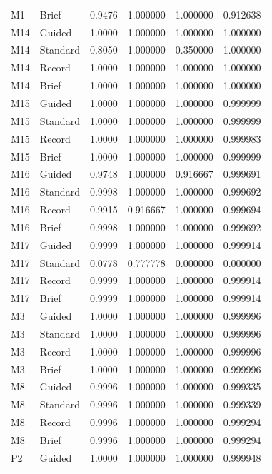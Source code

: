 \begin{longtable}{@{}llrrrr@{}}
M1 & Brief & 0.9476 & 1.000000 & 1.000000 & 0.912638 \\
\addlinespace[3pt]
M14 & Guided & 1.0000 & 1.000000 & 1.000000 & 1.000000 \\
M14 & Standard & 0.8050 & 1.000000 & 0.350000 & 1.000000 \\
M14 & Record & 1.0000 & 1.000000 & 1.000000 & 1.000000 \\
M14 & Brief & 1.0000 & 1.000000 & 1.000000 & 1.000000 \\
\addlinespace[3pt]
M15 & Guided & 1.0000 & 1.000000 & 1.000000 & 0.999999 \\
M15 & Standard & 1.0000 & 1.000000 & 1.000000 & 0.999999 \\
M15 & Record & 1.0000 & 1.000000 & 1.000000 & 0.999983 \\
M15 & Brief & 1.0000 & 1.000000 & 1.000000 & 0.999999 \\
\addlinespace[3pt]
M16 & Guided & 0.9748 & 1.000000 & 0.916667 & 0.999691 \\
M16 & Standard & 0.9998 & 1.000000 & 1.000000 & 0.999692 \\
M16 & Record & 0.9915 & 0.916667 & 1.000000 & 0.999694 \\
M16 & Brief & 0.9998 & 1.000000 & 1.000000 & 0.999692 \\
\addlinespace[3pt]
M17 & Guided & 0.9999 & 1.000000 & 1.000000 & 0.999914 \\
M17 & Standard & 0.0778 & 0.777778 & 0.000000 & 0.000000 \\
M17 & Record & 0.9999 & 1.000000 & 1.000000 & 0.999914 \\
M17 & Brief & 0.9999 & 1.000000 & 1.000000 & 0.999914 \\
\addlinespace[3pt]
M3 & Guided & 1.0000 & 1.000000 & 1.000000 & 0.999996 \\
M3 & Standard & 1.0000 & 1.000000 & 1.000000 & 0.999996 \\
M3 & Record & 1.0000 & 1.000000 & 1.000000 & 0.999996 \\
M3 & Brief & 1.0000 & 1.000000 & 1.000000 & 0.999996 \\
\addlinespace[3pt]
M8 & Guided & 0.9996 & 1.000000 & 1.000000 & 0.999335 \\
M8 & Standard & 0.9996 & 1.000000 & 1.000000 & 0.999339 \\
M8 & Record & 0.9996 & 1.000000 & 1.000000 & 0.999294 \\
M8 & Brief & 0.9996 & 1.000000 & 1.000000 & 0.999294 \\
\addlinespace[3pt]
P2 & Guided & 1.0000 & 1.000000 & 1.000000 & 0.999948 \\

\end{longtable}
